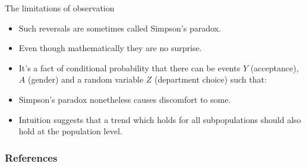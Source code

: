 \documentclass[handout]{beamer}
\begin{document}
\begin{frame}{The limitations of observation}
\scriptsize{

\begin{itemize}

\item Such reversals are sometimes called Simpson's paradox. 
\item Even though mathematically they are no surprise.
\item It's a fact of conditional probability that there can be events $Y$ (acceptance), $A$ (gender) and a random variable $Z$ (department choice) such that:
\item Simpson's paradox nonetheless causes discomfort to some.

\item Intuition suggests that a trend which holds for all subpopulations should also hold at the population level.


\end{itemize}

} 

\end{frame}



\begin{frame}[allowframebreaks]\scriptsize
\frametitle{References}


%
\end{frame}  









\end{document}
